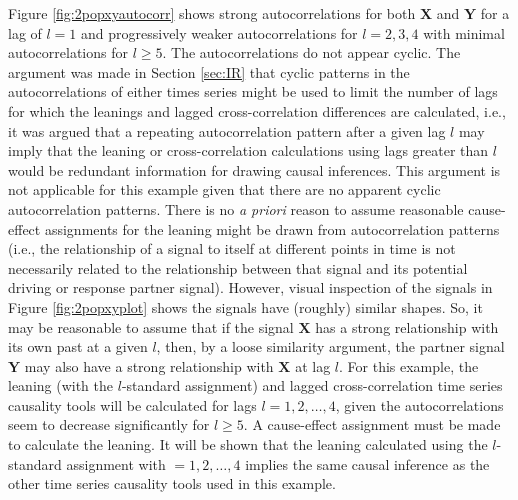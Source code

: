 \documentclass{article}[10pt]
\begin{document}
Figure \ref{fig:2popxyautocorr} shows strong autocorrelations for both $\mathbf{X}$ and $\mathbf{Y}$ for a lag of $l=1$ and progressively weaker autocorrelations for $l=2,3,4$ with minimal autocorrelations for $l\ge 5$.  The autocorrelations do not appear cyclic.  The argument was made in Section \ref{sec:IR} that cyclic patterns in the autocorrelations of either times series might be used to limit the number of lags for which the leanings and lagged cross-correlation differences are calculated, i.e., it was argued that a repeating autocorrelation pattern after a given lag $l$ may imply that the leaning or cross-correlation calculations using lags greater than $l$ would be redundant information for drawing causal inferences.  This argument is not applicable for this example given that there are no apparent cyclic autocorrelation patterns.  There is no {\em a priori} reason to assume reasonable cause-effect assignments for the leaning might be drawn from autocorrelation patterns (i.e., the relationship of a signal to itself at different points in time is not necessarily related to the relationship between that signal and its potential driving or response partner signal).  However, visual inspection of the signals in Figure \ref{fig:2popxyplot} shows the signals have (roughly) similar shapes.  So, it may be reasonable to assume that if the signal $\mathbf{X}$ has a strong relationship with its own past at a given $l$, then, by a loose similarity argument, the partner signal $\mathbf{Y}$ may also have a strong relationship with $\mathbf{X}$ at lag $l$.  For this example, the leaning (with the $l$-standard assignment) and lagged cross-correlation time series causality tools will be calculated for lags $l=1,2,\ldots,4$, given the autocorrelations seem to decrease significantly for $l\ge 5$.  A cause-effect assignment must be made to calculate the leaning.  It will be shown that the leaning calculated using the $l$-standard assignment with $=1,2,\ldots,4$ implies the same causal inference as the other time series causality tools used in this example.  
\end{document}

